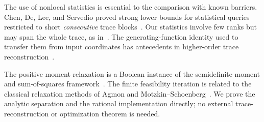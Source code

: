 The use of nonlocal statistics is essential to the comparison with known
barriers. Chen, De, Lee, and Servedio proved strong lower bounds for
statistical queries restricted to short \emph{consecutive} trace
blocks~\cite{CDLS2024}. Our statistics involve few ranks but may span the
whole trace, as in~\cite{BVW2026}. The generating-function identity used
to transfer them from input coordinates has antecedents in higher-order
trace reconstruction~\cite{CDLSS2021Smoothed,Chase2021Upper}.

The positive moment relaxation is a Boolean instance of the semidefinite
moment and sum-of-squares framework~\cite{Lasserre2001,Parrilo2000}.
The finite feasibility iteration is related to the classical relaxation
methods of Agmon and Motzkin--Schoenberg~\cite{Agmon1954,MotzkinSchoenberg1954}.
We prove the analytic separation and the rational implementation directly;
no external trace-reconstruction or optimization theorem is needed.
